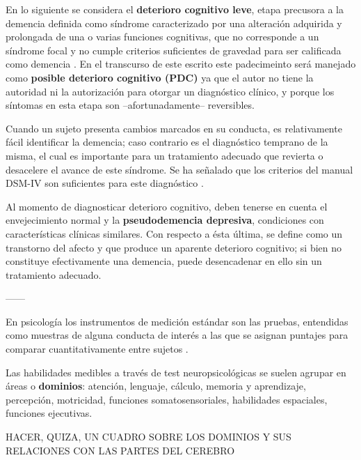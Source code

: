 En lo siguiente se considera el 
\textbf{deterioro cognitivo leve}, etapa precusora a la demencia definida como
síndrome caracterizado por una alteración adquirida y prolongada de una o varias funciones 
cognitivas, que no corresponde a un síndrome focal y no cumple criterios suficientes de 
gravedad para ser calificada como demencia \cite{Robles02}.
En el transcurso de este escrito este padecimeinto
será manejado como \textbf{posible deterioro cognitivo (PDC)} ya
que el autor no tiene la autoridad ni la autorización para otorgar un diagnóstico clínico, y porque
los síntomas en esta etapa son --afortunadamente-- reversibles.

Cuando un sujeto presenta cambios marcados en su conducta, es relativamente fácil identificar
la demencia; caso contrario es el diagnóstico temprano de la misma, el cual es importante
para un tratamiento adecuado que 
revierta o desacelere el avance de este síndrome.
Se ha señalado que los criterios del manual DSM-IV son suficientes para este diagnóstico
\cite{Knopman01}.

Al momento de diagnosticar deterioro cognitivo, deben tenerse en cuenta
el envejecimiento normal y la \textbf{pseudodemencia depresiva}, condiciones
con características clínicas similares. Con respecto a ésta última, se define como un
transtorno del afecto y que produce un aparente deterioro cognitivo;
si bien no constituye efectivamente una demencia, puede desencadenar en ello sin un
tratamiento adecuado.

------

En psicología los instrumentos de medición estándar son las pruebas, entendidas como muestras
de alguna conducta de interés a las que se asignan puntajes para comparar cuantitativamente
entre sujetos \cite{Ardila12}.

Las habilidades medibles a través de test neuropsicológicas se suelen agrupar en áreas o
\textbf{dominios}: atención, lenguaje, cálculo, memoria y aprendizaje, percepción,
motricidad, funciones somatosensoriales, habilidades espaciales, funciones ejecutivas. 

HACER, QUIZA, UN CUADRO SOBRE LOS DOMINIOS Y SUS RELACIONES CON LAS PARTES DEL CEREBRO

